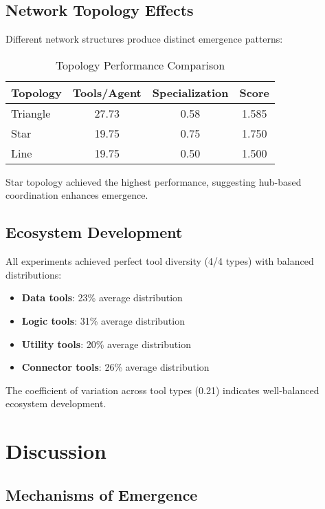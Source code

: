 \documentclass[10pt,twocolumn]{article}
\begin{document}
\subsection{Network Topology Effects}

Different network structures produce distinct emergence patterns:

\begin{table}[H]
\centering
\caption{Topology Performance Comparison}
\begin{tabular}{@{}lccc@{}}
\toprule
\textbf{Topology} & \textbf{Tools/Agent} & \textbf{Specialization} & \textbf{Score} \\
\midrule
Triangle & 27.73 & 0.58 & 1.585 \\
Star & 19.75 & 0.75 & 1.750 \\
Line & 19.75 & 0.50 & 1.500 \\
\bottomrule
\end{tabular}
\end{table}

Star topology achieved the highest performance, suggesting hub-based coordination enhances emergence.

\subsection{Ecosystem Development}

All experiments achieved perfect tool diversity (4/4 types) with balanced distributions:

\begin{itemize}
\item \textbf{Data tools}: 23\% average distribution
\item \textbf{Logic tools}: 31\% average distribution  
\item \textbf{Utility tools}: 20\% average distribution
\item \textbf{Connector tools}: 26\% average distribution
\end{itemize}

The coefficient of variation across tool types (0.21) indicates well-balanced ecosystem development.

\section{Discussion}

\subsection{Mechanisms of Emergence}
\end{document}
